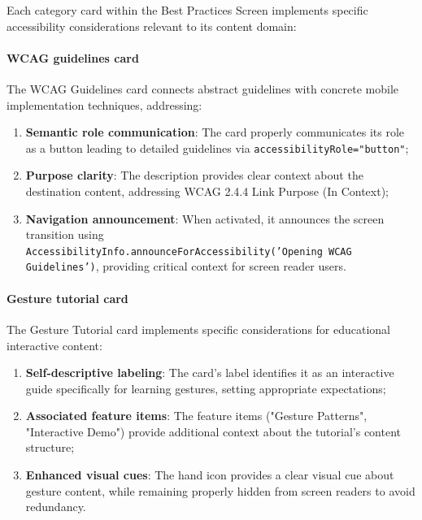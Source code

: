 Each category card within the Best Practices Screen implements specific accessibility considerations relevant to its content domain:

\paragraph{WCAG guidelines card}

The WCAG Guidelines card connects abstract guidelines with concrete mobile implementation techniques, addressing:

\begin{enumerate}
    \item \textbf{Semantic role communication}: The card properly communicates its role as a button leading to detailed guidelines via \texttt{accessibilityRole="button"};
    
    \item \textbf{Purpose clarity}: The description provides clear context about the destination content, addressing WCAG 2.4.4 Link Purpose (In Context);
    
    \item \textbf{Navigation announcement}: When activated, it announces the screen transition using \\ \texttt{AccessibilityInfo.announceForAccessibility('Opening WCAG Guidelines')}, providing critical context for screen reader users.
\end{enumerate}

\paragraph{Gesture tutorial card}

The Gesture Tutorial card implements specific considerations for educational interactive content:

\begin{enumerate}
    \item \textbf{Self-descriptive labeling}: The card's label identifies it as an interactive guide specifically for learning gestures, setting appropriate expectations;
    
    \item \textbf{Associated feature items}: The feature items ("Gesture Patterns", "Interactive Demo") provide additional context about the tutorial's content structure;
    
    \item \textbf{Enhanced visual cues}: The hand icon provides a clear visual cue about gesture content, while remaining properly hidden from screen readers to avoid redundancy.
\end{enumerate}


